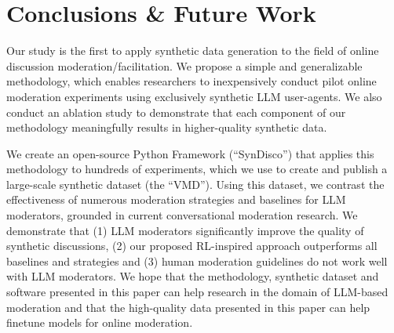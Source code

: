 %
\section{Conclusions \& Future Work}

Our study is the first to apply synthetic data generation to the field of online discussion moderation/facilitation. We propose a simple and generalizable methodology, which enables researchers to inexpensively conduct pilot online moderation experiments using exclusively synthetic \ac{LLM} user-agents. We also conduct an ablation study to demonstrate that each component of our methodology meaningfully results in higher-quality synthetic data.

We create an open-source Python Framework (“SynDisco”) that applies this methodology to hundreds of experiments, which we use to create and publish a large-scale synthetic dataset (the “\acf{VMD}”). Using this dataset, we contrast the effectiveness of numerous moderation strategies and baselines  for \ac{LLM} moderators, grounded in current conversational moderation research. We demonstrate that (1) \ac{LLM} moderators significantly improve the quality of synthetic discussions, (2) our proposed \ac{RL}-inspired approach outperforms all baselines and strategies and (3) human moderation guidelines do not work well with \ac{LLM} moderators. We hope that the methodology, synthetic dataset and software presented in this paper can help research in the domain of \ac{LLM}-based moderation and that the high-quality data presented in this paper can help finetune models for online moderation.
